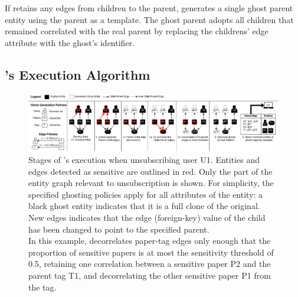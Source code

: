 If \proto retains any edges from children to the parent, \proto generates a single ghost parent entity using the
parent as a template. The ghost parent adopts all children that remained correlated with the real
parent by replacing the childrens' edge attribute with the ghost's identifier.
 

\iffalse
\subsection{\proto's Execution Algorithm}
\begin{figure}[ht!]
    \centering
    \includegraphics[width=\textwidth]{img/algo}

    \caption{Stages of \proto's execution when unsubscribing user U1. Entities and edges detected as
    sensitive are outlined in red. Only the part of the entity graph relevant to unsubscription is shown.
    For simplicity, the specified ghosting policies apply for all attributes
    of the entity: a black ghost entity indicates that it is a full clone of the original.
    New edges indicates that the edge (foreign-key) value of the child has been changed to
    point to the specified parent.\\
    In this example, \proto decorrelates paper-tag edges only enough that the proportion of sensitive papers
    is at most the sensitivity threshold of 0.5, retaining one correlation between a sensitive
    paper P2 and the parent tag T1, and decorrelating the other sensitive paper P1 from the tag.}
    \label{fig:algo}
\end{figure}


